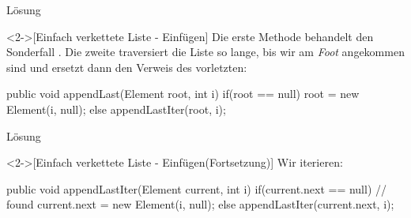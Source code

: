 \begin{frame}[fragile,c]{Lösung}
    \begin{solve}<2->[Einfach verkettete Liste - Einfügen]
        Die erste Methode behandelt den Sonderfall . Die zweite traversiert die Liste so lange,\pause{} bis wir am \emph{Foot} angekommen sind und ersetzt dann den Verweis des vorletzten:\pause{}
\begin{plainjava}
public void appendLast(Element root, int i) {
    if(root == null) root = new Element(i, null);
    else appendLastIter(root, i);
}
\end{plainjava}
    \end{solve}
\end{frame}

\begin{frame}[fragile,c]{Lösung}
    \addtocounter{solve}{-1}
    \begin{solve}<2->[Einfach verkettete Liste - Einfügen\hfill{}(Fortsetzung)]
        Wir iterieren:
\begin{plainjava}
public void appendLastIter(Element current, int i){
    if(current.next == null) // found
        current.next = new Element(i, null);
    else appendLastIter(current.next, i);
}
\end{plainjava}
    \end{solve}
\end{frame}
\fi

\def\Element#1{{\renewcommand{\arraystretch}{1.4}%
    \begin{tabular}{|p{1em}|>{\centering}p{1em}|p{1em}|}
        \hline
            & \strut#1 & \\
        \hline
    \end{tabular}%
}}


